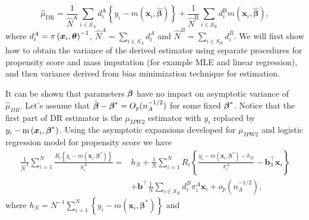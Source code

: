 \documentclass[
  letterpaper,
  DIV=11,
  numbers=noendperiod]{scrreprt}
\begin{document}
\[
\begin{equation*}
    \hat{\mu}_{\mathrm{DR}}=\frac{1}{\hat{N}^{\mathrm{A}}} \sum_{i \in \mathcal{S}_{\mathrm{A}}} d_i^{\mathrm{A}}\left\{y_i-m\left(\boldsymbol{x}_i, \hat{\boldsymbol{\beta}}\right)\right\}+\frac{1}{\hat{N}^{\mathrm{B}}} \sum_{i \in \mathcal{S}_{\mathrm{B}}} d_i^{\mathrm{B}} m\left(\boldsymbol{x}_i, \hat{\boldsymbol{\beta}}\right),
\end{equation*}
\] where \(d_i^A = \pi \left(\boldsymbol{x}_i, \boldsymbol{\theta}\right)^{-1}\),
\(\hat{N}^A = \sum_{i \in S_A} d_i^A\) and
\(\hat{N}^B = \sum_{i \in S_B} d_i^B\). We will first show how to obtain
the variance of the derived estimator using separate procedures for
propensity score and mass imputation (for example MLE and linear
regression), and then variance derived from bias minimization technique
for estimation.

It can be shown that parameters \(\boldsymbol{\beta}\) have no impact on asymptotic
variance of \(\hat{\mu}_{DR}\). Let's assume that
\(\hat{\boldsymbol{\beta}} - \boldsymbol{\beta}^* = O_p(n_A^{-1/2})\) for some fixed
\(\boldsymbol{\beta}^*\). Notice that the first part of DR estimator is the
\(\mu_{IPW2}\) estimator with \(y_i\) replaced by
\(y_i - \operatorname{m}\left(\boldsymbol{x}_i,\boldsymbol{\beta}^*\right)\). Using the
asymptotic expansions developed for \(\mu_{IPW2}\) and logistic
regression model for propensity score we have \[
\begin{equation}
\begin{aligned}
\frac{1}{\hat{N}^A} \sum_{i=1}^N \frac{R_i\left\{y_i-m\left(\boldsymbol{x}_i, \boldsymbol{\beta}^*\right)\right\}}{\hat{\pi}_i^A}= & h_N+\frac{1}{N} \sum_{i=1}^N R_i\left\{\frac{y_i-m\left(\boldsymbol{x}_i, \boldsymbol{\beta}^*\right)-h_N}{\pi_i^A}-\mathbf{b}_3^{\top} \boldsymbol{x}_i\right\} \\
& +\mathbf{b}^{\top} \frac{1}{N} \sum_{i \in \mathcal{S}_B} d_i^B \pi_i^A \boldsymbol{x}_i+o_p\left(n_A^{-1 / 2}\right),
\end{aligned}
\end{equation}
\] where
\(h_N=N^{-1} \sum_{i=1}^N\left\{y_i-m\left(\boldsymbol{x}_i, \boldsymbol{\beta}^*\right)\right\}\)
and
\end{document}
